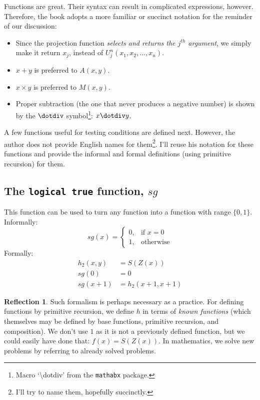 \documentclass[11pt]{book}
\theoremstyle{definition}
\theoremstyle{plain}
\theoremstyle{problemstyle}
\theoremstyle{remark}
\theoremstyle{definition}
\newtheorem{reflection}{Reflection}
\begin{document}
Functions are great. Their syntax can result in complicated expressions, however. Therefore, the book adopts a more familiar or succinct notation for the reminder of our discussion:
\begin{itemize}
    \item Since the projection function \emph{selects and returns the $j^{th}$ argument}, we simply make it return $x_j$, instead of $U^n_j(x_1,x_2,\dots,x_n)$.
    \item $x+y$ is preferred to $A(x,y)$.
    \item $x\times y$ is preferred to $M(x,y)$.
    \item Proper subtraction (the one that never produces a negative number) is shown by the $\dotdiv$ symbol\footnote{Macro `\textbackslash dotdiv' from the \texttt{mathabx} package.}: $x\dotdiv y$.
\end{itemize}

A few functions useful for testing conditions are defined next. However, the author does not provide English names for them\footnote{I'll try to name them, hopefully succinctly.}. I'll reuse his notation for these functions and provide the informal and formal definitions (using primitive recursion) for them.

\subsection*{The \texttt{logical true} function, $sg$}
This function can be used to turn any function into a function with range $\{0, 1\}$. Informally:
\[
    sg(x)=\begin{cases}
			0, & \text{if $x=0$}\\
            1, & \text{otherwise}
	\end{cases}
\]
Formally:
            \begin{equation}
                \label{eq:logical-true}
                \begin{aligned}
                    h_2(x,y)&=S(Z(x))\\
                    sg(0)&=0\\
                    sg(x+1)&=h_2(x+1,x+1)
                \end{aligned}
            \end{equation}

\begin{reflection}
    Such formalism is perhaps necessary as a practice. For defining functions by primitive recursion, we define $h$ in terms of \emph{known functions} (which themselves may be defined by base functions, primitive recursion, and composition). We don't use $1$ as it is not a previously defined function, but we could easily have done that: $f(x)=S(Z(x))$. In mathematics, we solve new problems by referring to already solved problems.
\end{reflection}
\end{document}
